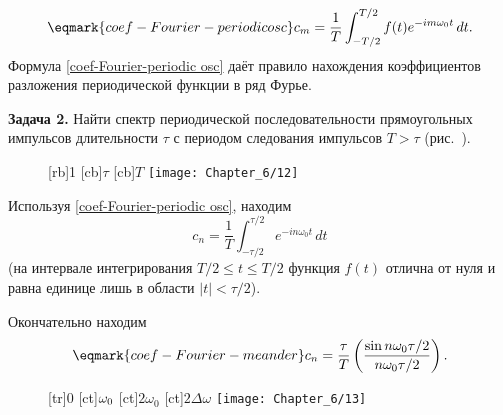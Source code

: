 \begin{equation}
    \eqmark{coef-Fourier-periodic osc}
    c_m=\frac{1}{T}\int_{-T/2}^{T/2} f(t)e^{-im\omega_0 t}\,dt.
\end{equation}
Формула \eqref{coef-Fourier-periodic osc} даёт правило нахождения коэффициентов
разложения периодической функции в ряд Фурье.

\textbf{Задача 2.} Найти спектр периодической последовательности прямоугольных
импульсов длительности $\tau$ с периодом следования
импульсов $T>\tau$ (рис.~).

\begin{wrapfigure}[]{r}{0.4\textwidth}
    [rb]{1}
    [cb]{$\tau$}
    [cb]{$T$}
    \texttt{[image: Chapter\_6/12]}
    \caption{}
\end{wrapfigure}
Используя \eqref{coef-Fourier-periodic osc}, находим
\begin{equation*}
    c_n =\frac{1}{T}\int_{-\tau/2}^{\tau/2} e^{-in\omega_0 t}\,dt
\end{equation*}
(на интервале интегрирования $T/2\le t \le T/2$ функция $f(t)$ отлична от нуля и
равна единице лишь в области
$|t|<\tau/2$).

%

Окончательно находим
\begin{equation}
    \eqmark{coef-Fourier-meander}
    c_n=\frac{\tau}{T}\left(\frac{\sin n\omega_0\tau/2}{n\omega_0\tau/2}\right).
\end{equation}

\begin{figure}[h!]
    \small
    [tr]{0}
    [ct]{$\vphantom{2}\omega_0$}
    [ct]{$2\omega_0$}
    [ct]{$2\Delta\omega$}
    \texttt{[image: Chapter\_6/13]}
    \caption{}
\end{figure}

